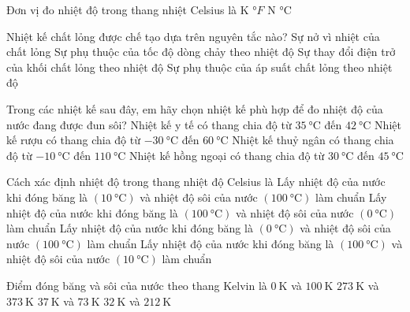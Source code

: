 \begin{ex}
Đơn vị đo nhiệt độ trong thang nhiệt Celsius là
	\choice
	{$\si{\kelvin}$}
	{$\si{\degree F}$}
	{$\si{\newton}$}
	{\True $\si{\celsius}$}
	\loigiai{
		
	}
\end{ex}
\begin{ex}
	Nhiệt kế chất lỏng được chế tạo dựa trên nguyên tắc nào?
	\choice
	{\True Sự nở vì nhiệt của chất lỏng}
	{Sự phụ thuộc của tốc độ dòng chảy theo nhiệt độ}
	{Sự thay đổi điện trở của khối chất lỏng theo nhiệt độ}
	{Sự phụ thuộc của áp suất chất lỏng theo nhiệt độ}
	\loigiai{
		
	}
\end{ex}
\begin{ex}
Trong các nhiệt kế sau đây, em hãy chọn nhiệt kế phù hợp để đo nhiệt độ của nước đang được đun sôi?
	\choice
	{Nhiệt kế y tế có thang chia độ từ $\SI{35}{\celsius}$ đến $\SI{42}{\celsius}$}
	{ Nhiệt kế rượu có thang chia độ từ $\SI{-30}{\celsius}$ đến $\SI{60}{\celsius}$}
	{\True Nhiệt kế thuỷ ngân có thang chia độ từ $\SI{-10}{\celsius}$ đến $\SI{110}{\celsius}$}
	{Nhiệt kế hồng ngoại có thang chia độ từ $\SI{30}{\celsius}$ đến $\SI{45}{\celsius}$}
	\loigiai{
		
	}
\end{ex}
\begin{ex}
	Cách xác định nhiệt độ trong thang nhiệt độ Celsius là
	\choice
	{Lấy nhiệt độ của nước khi đóng băng là $\left(\SI{10}{\celsius}\right)$ và nhiệt độ sôi của nước $\left(\SI{100}{\celsius}\right)$ làm chuẩn}
	{Lấy nhiệt độ của nước khi đóng băng là $\left(\SI{100}{\celsius}\right)$ và nhiệt độ sôi của nước $\left(\SI{0}{\celsius}\right)$ làm chuẩn}
	{\True Lấy nhiệt độ của nước khi đóng băng là $\left(\SI{0}{\celsius}\right)$ và nhiệt độ sôi của nước $\left(\SI{100}{\celsius}\right)$ làm chuẩn}
	{Lấy nhiệt độ của nước khi đóng băng là $\left(\SI{100}{\celsius}\right)$ và nhiệt độ sôi của nước $\left(\SI{10}{\celsius}\right)$ làm chuẩn}
	\loigiai{
		
	}
\end{ex}
\begin{ex}
	Điểm đóng băng và sôi của nước theo thang Kelvin là
	\choice
	{$\SI{0}{\kelvin}$ và $\SI{100}{\kelvin}$}
	{\True $\SI{273}{\kelvin}$ và $\SI{373}{\kelvin}$}
	{$\SI{37}{\kelvin}$ và $\SI{73}{\kelvin}$}
	{$\SI{32}{\kelvin}$ và $\SI{212}{\kelvin}$}
	\loigiai{
		
	}
\end{ex}

